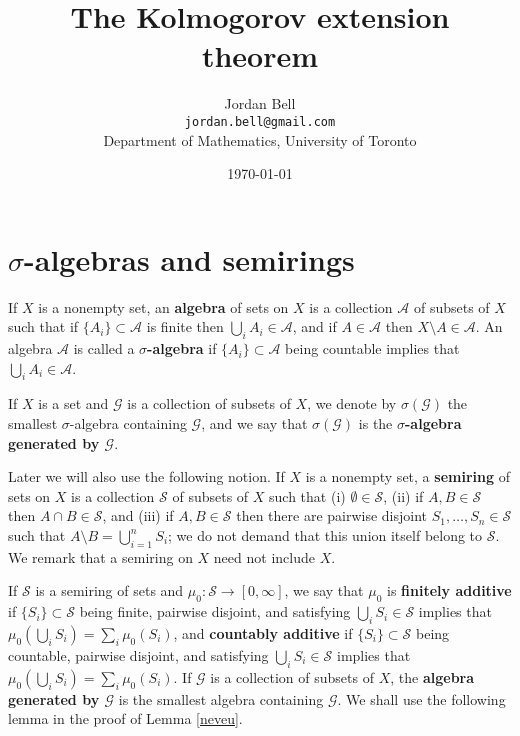 \documentclass{article}
\theoremstyle{definition}
\begin{document}
\title{The Kolmogorov extension theorem}
\author{Jordan Bell\\ \texttt{jordan.bell@gmail.com}\\Department of Mathematics, University of Toronto}
\date{\today}

\maketitle

\section{$\sigma$-algebras and semirings}
If $X$ is a nonempty set, an \textbf{algebra} of sets on $X$ is a  collection $\mathscr{A}$ of subsets of
$X$ such that if $\{A_i\} \subset \mathscr{A}$ is finite then $\bigcup_i A_i \in \mathscr{A}$,
and if $A \in \mathscr{A}$ then $X \setminus A \in \mathscr{A}$. An algebra
$\mathscr{A}$ is called a \textbf{$\sigma$-algebra} if $\{A_i\} \subset \mathscr{A}$ being countable
implies that $\bigcup_i A_i \in \mathscr{A}$.

If $X$ is a set and  $\mathscr{G}$ is a collection of subsets of $X$,
we denote by $\sigma(\mathscr{G})$ the smallest $\sigma$-algebra containing $\mathscr{G}$, and we say that $\sigma(\mathscr{G})$ is the
\textbf{$\sigma$-algebra generated by $\mathscr{G}$}. 

Later  we will also use the following notion. If $X$ is a nonempty set, a \textbf{semiring} of sets on $X$ is a collection $\mathscr{S}$ of subsets of $X$
such that (i) $\emptyset \in \mathscr{S}$, (ii) if $A,B \in \mathscr{S}$ then $A \cap B \in \mathscr{S}$, and (iii) if $A,B \in \mathscr{S}$ then
there are pairwise disjoint $S_1,\ldots,S_n \in \mathscr{S}$ such that $A \setminus B = \bigcup_{i=1}^n S_i$; we do not demand that this union
itself belong to $\mathscr{S}$. We remark that a semiring on $X$ need not include $X$.

If $\mathscr{S}$ is a semiring of sets and $\mu_0:\mathscr{S} \to [0,\infty]$, we say that $\mu_0$ is
\textbf{finitely additive} if $\{S_i\} \subset \mathscr{S}$ being finite, pairwise disjoint, and satisfying $\bigcup_i S_i \in \mathscr{S}$ 
implies that $\mu_0\left(\bigcup_i S_i \right) = \sum_i \mu_0(S_i)$, and
\textbf{countably additive} if $\{S_i\} \subset \mathscr{S}$ being countable, pairwise disjoint, and satisfying $\bigcup_i S_i \in \mathscr{S}$ 
implies that $\mu_0\left(\bigcup_i S_i \right) = \sum_i \mu_0(S_i)$. 
If $\mathscr{G}$ is a collection of subsets of $X$, 
 the \textbf{algebra generated by $\mathscr{G}$} is the smallest algebra containing $\mathscr{G}$.
We shall use the following lemma in the proof of Lemma \ref{neveu}.
\end{document}
